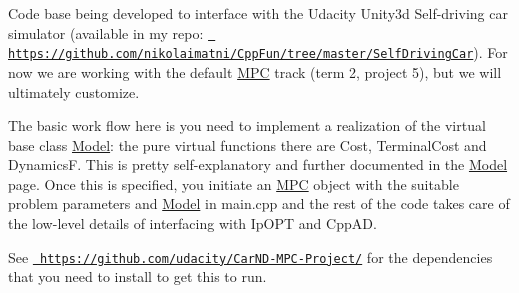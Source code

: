 Code base being developed to interface with the Udacity Unity3d Self-\/driving car simulator (available in my repo\+: \href{https://github.com/nikolaimatni/CppFun/tree/master/SelfDrivingCar}\texttt{ https\+://github.\+com/nikolaimatni/\+Cpp\+Fun/tree/master/\+Self\+Driving\+Car}). For now we are working with the default \mbox{\hyperlink{classMPC}{M\+PC}} track (term 2, project 5), but we will ultimately customize.

The basic work flow here is you need to implement a realization of the virtual base class \mbox{\hyperlink{classModel}{Model}}\+: the pure virtual functions there are Cost, Terminal\+Cost and DynamicsF. This is pretty self-\/explanatory and further documented in the \mbox{\hyperlink{classModel}{Model}} page. Once this is specified, you initiate an \mbox{\hyperlink{classMPC}{M\+PC}} object with the suitable problem parameters and \mbox{\hyperlink{classModel}{Model}} in main.\+cpp and the rest of the code takes care of the low-\/level details of interfacing with Ip\+O\+PT and Cpp\+AD.

See \href{https://github.com/udacity/CarND-MPC-Project/}\texttt{ https\+://github.\+com/udacity/\+Car\+N\+D-\/\+M\+P\+C-\/\+Project/} for the dependencies that you need to install to get this to run. 